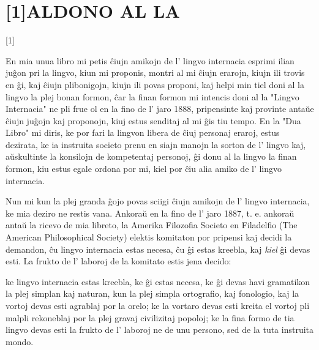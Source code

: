 \documentclass[12pt,twoside]{book}
\begin{document}
\sloppy
{}


%
%
\titleformat{\chapter}[display]{\centering}{\chaptertitlename}{0pt}{\Huge}
\renewcommand{\footrulewidth}{0pt}
\chapter*{\scalebox{0.8}[1]{ALDONO AL LA}}
\fancyhead[C]{--- \thepage{} ---}

\begin{center}
\vspace{1ex}
\scalebox{1}[1]{}

\end{center}


 En mia unua libro mi petis ĉiujn amikojn de l' lingvo internacia esprimi ilian juĝon pri la lingvo, kiun mi proponis, montri al mi ĉiujn erarojn, kiujn ili trovis en ĝi, kaj ĉiujn plibonigojn, kiujn ili povas proponi, kaj helpi min tiel doni al la lingvo la plej bonan formon, ĉar la finan formon mi intencis doni al la "Lingvo Internacia" ne pli frue ol en la fino de l' jaro 1888, pripensinte kaj provinte antaŭe ĉiujn juĝojn kaj proponojn, kiuj estus senditaj al mi ĝis tiu tempo. En la "Dua Libro" mi diris, ke por fari la lingvon libera de ĉiuj personaj eraroj, estus dezirata, ke ia instruita societo prenu en siajn manojn la sorton de l' lingvo kaj, aŭskultinte la konsilojn de kompetentaj personoj, ĝi donu al la lingvo la finan formon, kiu estus egale ordona por mi, kiel por ĉiu alia amiko de l' lingvo internacia.

Nun mi kun la plej granda ĝojo povas sciigi ĉiujn amikojn de l' lingvo internacia, ke mia deziro ne restis vana. Ankoraŭ en la fino de l' jaro 1887, t. e. ankoraŭ antaŭ la ricevo de mia libreto, la Amerika Filozofia Societo en Filadelfio (The American Philosophical Society) elektis komitaton por pripensi kaj decidi la demandon, ĉu lingvo internacia estas necesa, ĉu ĝi estas kreebla, kaj \emph{kiel} ĝi devas esti. La frukto de l' laboroj de la komitato estis jena decido:

    ke lingvo internacia estas kreebla, ke ĝi estas necesa, ke ĝi devas havi gramatikon la plej simplan kaj naturan, kun la plej simpla ortografio, kaj fonologio, kaj la vortoj devas esti agrablaj por la orelo; ke la vortaro devas esti kreita el vortoj pli malpli rekoneblaj por la plej gravaj civilizitaj popoloj; ke la fina formo de tia lingvo devas esti la frukto de l' laboroj ne de unu persono, sed de la tuta instruita mondo. 
\end{document}
